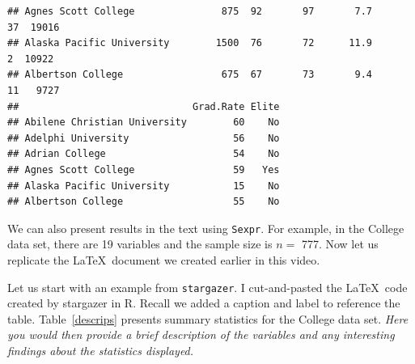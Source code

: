 \documentclass{article}\usepackage[]{graphicx}\usepackage[]{color}
\makeatletter
\newenvironment{kframe}{%
 \def\at@end@of@kframe{}%
 \ifinner\ifhmode%
  \def\at@end@of@kframe{\end{minipage}}%
  \begin{minipage}{\columnwidth}%
 \fi\fi%
 \def\FrameCommand##1{\hskip\@totalleftmargin \hskip-\fboxsep
 \colorbox{shadecolor}{##1}\hskip-\fboxsep
     \hskip-\linewidth \hskip-\@totalleftmargin \hskip\columnwidth}%
 \MakeFramed {\advance\hsize-\width
   \@totalleftmargin\z@ \linewidth\hsize
   \@setminipage}}%
 {\par\unskip\endMakeFramed%
 \at@end@of@kframe}
\newenvironment{knitrout}{}{} %
\makeatother
\begin{document}
\begin{knitrout}
\begin{kframe}
\begin{verbatim}
## Agnes Scott College               875  92       97       7.7          37  19016
## Alaska Pacific University        1500  76       72      11.9           2  10922
## Albertson College                 675  67       73       9.4          11   9727
##                              Grad.Rate Elite
## Abilene Christian University        60    No
## Adelphi University                  56    No
## Adrian College                      54    No
## Agnes Scott College                 59   Yes
## Alaska Pacific University           15    No
## Albertson College                   55    No
\end{verbatim}
\end{kframe}
\end{knitrout}


We can also present results in the text using {\tt Sexpr}.  For example, in the College data set, there are 19 variables and the sample size is $n = $ 777.  Now let us replicate the \LaTeX\ document we created earlier in this video.

Let us start with an example from {\tt stargazer}.  I cut-and-pasted the \LaTeX\ code created by stargazer in R.  Recall we added a caption and label to reference the table.  Table~\ref{descrips} presents summary statistics for the College data set.  {\em Here you would then provide a brief description of the variables and any interesting findings about the statistics displayed.}
\end{document}
